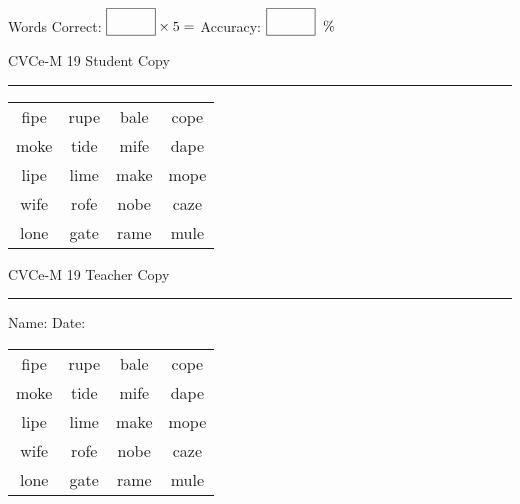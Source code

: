 \documentclass{memoir}
\begin{document}
\small

Words Correct: $\fbox{\phantom{\huge 100}} \times 5 = $ Accuracy: $\fbox{\phantom{\huge 100}}\;\; \%$ 

\vfill

\newpage


\footnotesize \noindent
CVCe-M 19 \hfill Student Copy
\smallskip
\hrule

\Large

\setlength{\tabcolsep}{14pt}
\def\arraystretch{2}

{\selectfont


\begin{vplace}[0.5]
\begin{center}
\begin{tabular}{cccc}
fipe & rupe & bale & cope \\
moke & tide & mife & dape \\
lipe & lime & make & mope \\
wife & rofe & nobe & caze \\
lone & gate & rame & mule \\
\end{tabular}
\end{center}
\end{vplace}

}

\newpage

\footnotesize \noindent
CVCe-M 19 \hfill Teacher Copy
\smallskip
\hrule

\small

\vfill

\noindent
Name: \underline{\hspace{1.75in}} \hfill Date: \underline{\hspace{1in}}

\Large

{\selectfont


\begin{vplace}[0.5]
\begin{center}
\begin{tabular}{cccc}
fipe & rupe & bale & cope \\
moke & tide & mife & dape \\
lipe & lime & make & mope \\
wife & rofe & nobe & caze \\
lone & gate & rame & mule \\
\end{tabular}
\end{center}
\end{vplace}



}
\end{document}
